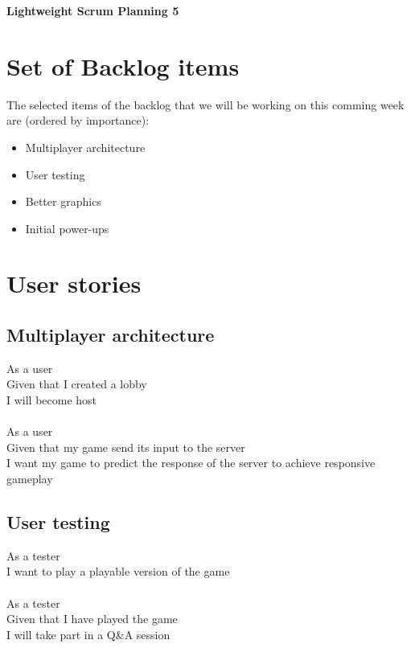 \documentclass{article}
\begin{document}
\begin{minipage}[H]{\textwidth}
\vspace{0.3cm}
		\begin{center}
		\vspace{0.3cm}
			\Huge{\textbf{Lightweight Scrum Planning 5}}\\
		\vspace{0.3cm}	
		\vspace{0.7cm}		
		\end{center}
	\end{minipage}

\section*{Set of Backlog items}
The selected items of the backlog that we will be working on this comming week  are (ordered by importance):
\begin{itemize}
	\item Multiplayer architecture
	\item User testing
	\item Better graphics
	\item Initial power-ups	
\end{itemize}

\section*{User stories}
\subsection*{Multiplayer architecture}
As a user\\
Given that I created a lobby\\
I will become host\\\\
As a user\\
Given that my game send its input to the server\\
I want my game to predict the response of the server to achieve responsive gameplay
\subsection*{User testing}
As a tester\\
I want to play a playable version of the game\\\\
As a tester\\
Given that I have played the game\\
I will take part in a Q\&A session
\end{document}
